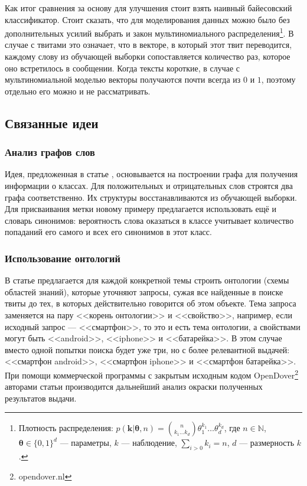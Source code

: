 Как итог сравнения за основу для улучшения стоит взять наивный байесовский классификатор. Стоит
сказать, что для моделирования данных можно было без дополнительных усилий выбрать
и закон мультиномиального распределения\footnote{
Плотность распределения:
$p(\mathbf{k}|\mathbf{\theta},n)=\binom{n}{k_1\ldots
  k_d}\theta_1^{k_1}\dots\theta_d^{k_d}$,
где $n\in\mathbb{N}$, $\mathbf{\theta}\in \{0,1\}^d$ ---
параметры, $k$ --- наблюдение, $\sum\limits_{i>0}k_i=n$, $d$ --- размерность $k$.
}. В случае с твитами это означает, что в векторе, в который этот твит
переводится, каждому слову из обучающей выборки сопоставляется количество раз, которое оно встретилось в сообщении. Когда тексты короткие, в случае с мультиномиальной моделью векторы
получаются почти всегда из $0$ и $1$, поэтому отдельно его можно и не рассматривать.

\subsection{Связанные идеи}

\subsubsection{Анализ графов слов}
Идея, предложенная в статье \cite{Colace2013}, основывается на построении графа для получения
информации о классах. Для положительных и отрицательных слов строятся два графа
соответственно. Их структуры восстанавливаются из обучающей выборки. Для присваивания метки новому
примеру предлагается использовать ещё и словарь синонимов: вероятность слова оказаться в классе учитывает количество
попаданий его самого и всех его синонимов в этот класс.

\subsubsection{Использование онтологий}
В статье \cite{Kontopoulos2013} предлагается для каждой конкретной темы строить
онтологии (схемы областей знаний), которые уточняют запросы, сужая все
найденные в поиске твиты до тех, в которых действительно говорится об этом объекте. Тема запроса заменяется на пару <<корень
онтологии>> и <<свойство>>, например, если исходный запрос --- <<смартфон>>, то
это и есть тема
онтологии, а свойствами могут быть <<android>>, <<iphone>> и <<батарейка>>. В этом случае вместо
одной попытки поиска будет уже три, но с более релевантной выдачей: <<смартфон android>>, <<смартфон
iphone>> и <<смартфон
батарейка>>. При помощи коммерческой программы с закрытым исходным кодом
OpenDover\footnote{opendover.nl} авторами статьи производится дальнейший анализ окраски полученных результатов
выдачи.


